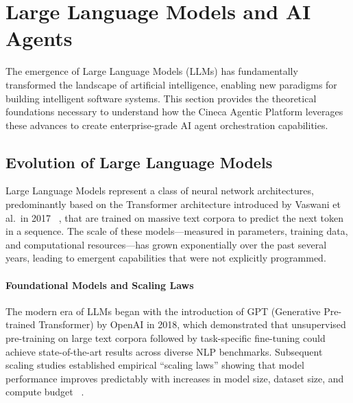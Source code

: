 %
%

\section{Large Language Models and AI Agents}
\label{sec:llm-agents}

The emergence of Large Language Models (LLMs) has fundamentally transformed the landscape of artificial intelligence, enabling new paradigms for building intelligent software systems. This section provides the theoretical foundations necessary to understand how the Cineca Agentic Platform leverages these advances to create enterprise-grade AI agent orchestration capabilities.

\subsection{Evolution of Large Language Models}

Large Language Models represent a class of neural network architectures, predominantly based on the Transformer architecture introduced by Vaswani et al.\ in 2017~%
, that are trained on massive text corpora to predict the next token in a sequence. The scale of these models---measured in parameters, training data, and computational resources---has grown exponentially over the past several years, leading to emergent capabilities that were not explicitly programmed.

\paragraph{Foundational Models and Scaling Laws}
The modern era of LLMs began with the introduction of GPT (Generative Pre-trained Transformer) by OpenAI in 2018, which demonstrated that unsupervised pre-training on large text corpora followed by task-specific fine-tuning could achieve state-of-the-art results across diverse NLP benchmarks. Subsequent scaling studies established empirical ``scaling laws'' showing that model performance improves predictably with increases in model size, dataset size, and compute budget~%
.


